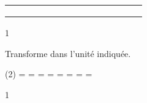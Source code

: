 \documentclass[a4paper,11pt]{report}
\begin{document}
\begin{exop}
{\begin{center}
\begin{tabular}{*{14}{|x{0.7cm}}|}
\hline
 &   & & & & &  &   & & & & & &\\

\hline
 &   & & & & &  &   & & & & & &\\

\hline
 &   & & & & &  &   & & & & & &\\

\hline
 &   & & & & &  &   & & & & & &\\

\hline

\end{tabular}
\egroup
\end{center}
}
{1}
\end{exop}

\begin{exop}
{
Transforme dans l'unité indiquée.
\begin{tasks}(2)
    \task {}= \dotfill \hspace{0.3cm}
     \hspace{0.3cm}
    \task {} = \dotfill \hspace{0.3cm}
     \hspace{0.3cm}
  \task {}= \dotfill \hspace{0.3cm}
     \hspace{0.3cm}
    \task {}= \dotfill \hspace{0.3cm}
     \hspace{0.3cm}
     \task {}= \dotfill \hspace{0.3cm}
     \hspace{0.3cm}
     \task {}= \dotfill \hspace{0.3cm}
     \hspace{0.3cm}
     \task {}= \dotfill \hspace{0.3cm}
     \hspace{0.3cm}
     \task {}= \dotfill \hspace{0.3cm}
     \hspace{0.3cm}
\end{tasks} 
}
{1}
\end{exop}
\end{document}
